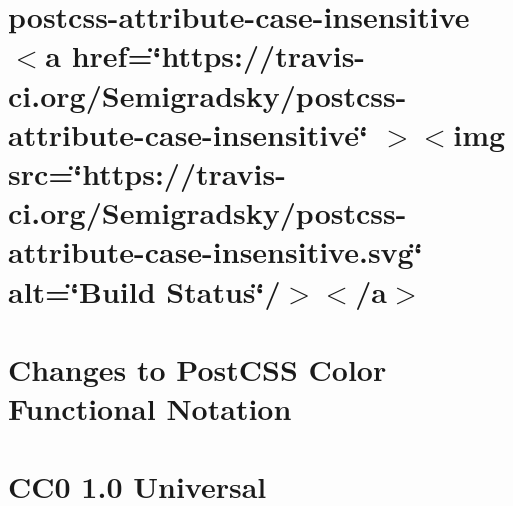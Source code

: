 \documentclass[twoside]{book}
\newcommand{\+}{\discretionary{\mbox{\scriptsize$\hookleftarrow$}}{}{}}
\begin{document}
\chapter{postcss-\/attribute-\/case-\/insensitive \texorpdfstring{$<$}{<}a href=\char`\"{}https\+://travis-\/ci.\+org/\+Semigradsky/postcss-\/attribute-\/case-\/insensitive\char`\"{} \texorpdfstring{$>$}{>}\texorpdfstring{$<$}{<}img src=\char`\"{}https\+://travis-\/ci.\+org/\+Semigradsky/postcss-\/attribute-\/case-\/insensitive.\+svg\char`\"{} alt=\char`\"{}\+Build Status\char`\"{}/\texorpdfstring{$>$}{>}\texorpdfstring{$<$}{<}/a\texorpdfstring{$>$}{>}}
\label{md__c___users_vaishnavi_jadhav__desktop__developer_code_mean_stack_example_client_node_modules_p640509d05ec98f0fc9cf8e9b5da8d78f}

\chapter{Changes to Post\+CSS Color Functional Notation}
\label{md__c___users_vaishnavi_jadhav__desktop__developer_code_mean_stack_example_client_node_modules_pa4fd3e0295e7c27cccd5fc3664ce11f4}

\chapter{CC0 1.0 Universal}
\label{md__c___users_vaishnavi_jadhav__desktop__developer_code_mean_stack_example_client_node_modules_p974b6cb6a3379e781ef0a9f28e534911}

\end{document}
